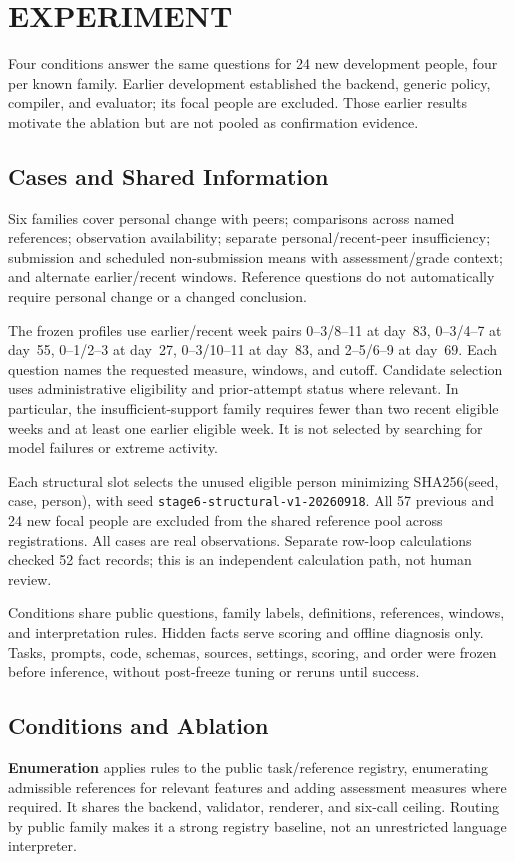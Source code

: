\section{\uppercase{Experiment}}
\label{sec:experiment}
\noindent Four conditions answer the same questions for 24 new development people, four per known family. Earlier development established the backend, generic policy, compiler, and evaluator; its focal people are excluded. Those earlier results motivate the ablation but are not pooled as confirmation evidence.\draftassist

\subsection{Cases and Shared Information}
Six families cover personal change with peers; comparisons across named references; observation availability; separate personal/recent-peer insufficiency; submission and scheduled non-submission means with assessment/grade context; and alternate earlier/recent windows. Reference questions do not automatically require personal change or a changed conclusion.

The frozen profiles use earlier/recent week pairs 0--3/8--11 at day~83, 0--3/4--7 at day~55, 0--1/2--3 at day~27, 0--3/10--11 at day~83, and 2--5/6--9 at day~69. Each question names the requested measure, windows, and cutoff. Candidate selection uses administrative eligibility and prior-attempt status where relevant. In particular, the insufficient-support family requires fewer than two recent eligible weeks and at least one earlier eligible week. It is not selected by searching for model failures or extreme activity.

Each structural slot selects the unused eligible person minimizing SHA256(seed, case, person), with seed \texttt{stage6-structural-v1-20260918}. All 57 previous and 24 new focal people are excluded from the shared reference pool across registrations. All cases are real observations. Separate row-loop calculations checked 52 fact records; this is an independent calculation path, not human review.

Conditions share public questions, family labels, definitions, references, windows, and interpretation rules. Hidden facts serve scoring and offline diagnosis only. Tasks, prompts, code, schemas, sources, settings, scoring, and order were frozen before inference, without post-freeze tuning or reruns until success.

\subsection{Conditions and Ablation}
\textbf{Enumeration} applies rules to the public task/reference registry, enumerating admissible references for relevant features and adding assessment measures where required. It shares the backend, validator, renderer, and six-call ceiling. Routing by public family makes it a strong registry baseline, not an unrestricted language interpreter.


